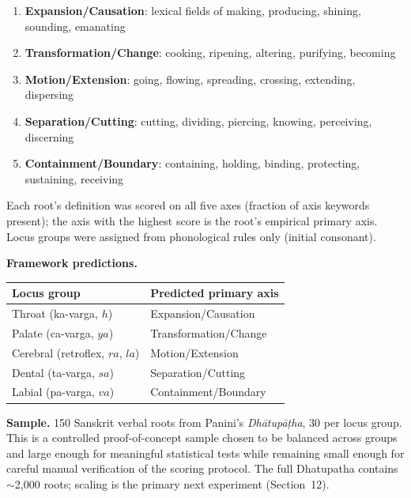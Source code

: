 \documentclass[12pt]{article}
\begin{document}
\begin{enumerate}
  \item \textbf{Expansion/Causation}: lexical fields of making, producing, shining, sounding, emanating
  \item \textbf{Transformation/Change}: cooking, ripening, altering, purifying, becoming
  \item \textbf{Motion/Extension}: going, flowing, spreading, crossing, extending, dispersing
  \item \textbf{Separation/Cutting}: cutting, dividing, piercing, knowing, perceiving, discerning
  \item \textbf{Containment/Boundary}: containing, holding, binding, protecting, sustaining, receiving
\end{enumerate}

Each root's definition was scored on all five axes (fraction of axis keywords present); the axis with the highest score is the root's empirical primary axis. Locus groups were assigned from phonological rules only (initial consonant).

\textbf{Framework predictions.}

\begin{center}
\begin{tabular}{ll}
\toprule
\textbf{Locus group} & \textbf{Predicted primary axis} \\
\midrule
Throat (ka-varga, $h$) & Expansion/Causation \\
Palate (ca-varga, $ya$) & Transformation/Change \\
Cerebral (retroflex, $ra$, $la$) & Motion/Extension \\
Dental (ta-varga, $sa$) & Separation/Cutting \\
Labial (pa-varga, $va$) & Containment/Boundary \\
\bottomrule
\end{tabular}
\end{center}

\textbf{Sample.} 150 Sanskrit verbal roots from Panini's \textit{Dh\={a}tup\={a}\d{t}ha}, 30 per locus group. This is a controlled proof-of-concept sample chosen to be balanced across groups and large enough for meaningful statistical tests while remaining small enough for careful manual verification of the scoring protocol. The full Dhatupatha contains $\sim$2,000 roots; scaling is the primary next experiment (Section~12).
\end{document}

